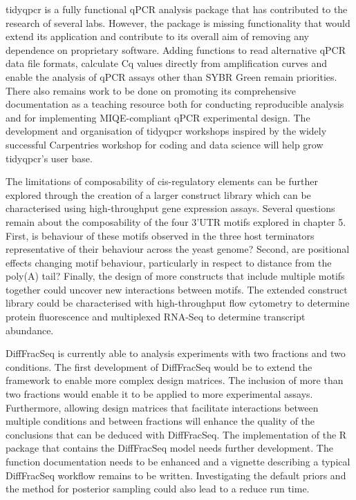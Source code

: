 \documentclass[../main.tex]{subfiles}
\begin{document}
tidyqpcr is a fully functional qPCR analysis package that has contributed to the research of several labs. 
However, the package is missing functionality that would extend its application and contribute to its overall aim of removing any dependence on proprietary software. 
Adding functions to read alternative qPCR data file formats, calculate Cq values directly from amplification curves and enable the analysis of qPCR assays other than SYBR Green remain priorities.
There also remains work to be done on promoting its comprehensive documentation as a teaching resource both for conducting reproducible analysis and for implementing MIQE-compliant qPCR experimental design.
The development and organisation of tidyqpcr workshops inspired by the widely successful Carpentries workshop for coding and data science will help grow tidyqpcr's user base.

The limitations of composability of cis-regulatory elements can be further explored through the creation of a larger construct library which can be characterised using high-throughput gene expression assays.
Several questions remain about the composability of the four 3'UTR motifs explored in chapter 5.
First, is behaviour of these motifs observed in the three host terminators representative of their behaviour across the yeast genome?
Second, are positional effects changing motif behaviour, particularly in respect to distance from the poly(A) tail?
Finally, the design of more constructs that include multiple motifs together could uncover new interactions between motifs.
The extended construct library could be characterised with high-throughput flow cytometry to determine protein fluorescence and multiplexed RNA-Seq to determine transcript abundance. 

DiffFracSeq is currently able to analysis experiments with two fractions and two conditions.
The first development of DiffFracSeq would be to extend the framework to enable more complex design matrices.
The inclusion of more than two fractions would enable it to be applied to more experimental assays.
Furthermore, allowing design matrices that facilitate interactions between multiple conditions and between fractions will enhance the quality of the conclusions that can be deduced with DiffFracSeq.
The implementation of the R package that contains the DiffFracSeq model needs further development. 
The function documentation needs to be enhanced and a vignette describing a typical DiffFracSeq workflow remains to be written.
Investigating the default priors and the method for posterior sampling could also lead to a reduce run time.
\end{document}
